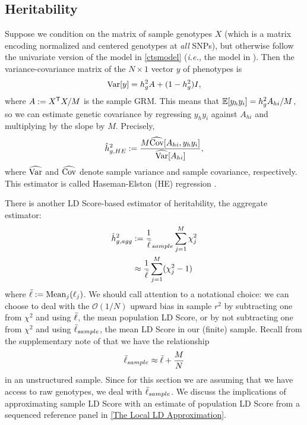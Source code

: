 \documentclass[11pt]{article}
\numberwithin{equation}{section}
\numberwithin{definition}{section}
\numberwithin{thm}{section}
\numberwithin{lemma}{section}
\numberwithin{prop}{section}
\numberwithin{cor}{section}
\numberwithin{hyp}{section}
\begin{document}
\subsection{Heritability}\label{HE:Heritability}

Suppose we condition on the matrix of sample genotypes $X$
(which is a matrix encoding normalized and centered genotypes at \emph{all} SNPs),
but otherwise follow the univariate version of the model in \ref{ctsmodel} (\emph{i.e.,} the model in \cite{buliksullivan2014}).
Then the variance-covariance matrix of the $N\times 1$ vector $y$ of phenotypes is
\begin{equation*}
	\mathrm{Var}[y]  =  h^2_gA + (1-h^2_g)I,
\end{equation*}
where $A := X^{\mathsf{T}}X/M$ is the sample GRM. 
This means that $\mathbb{E}[y_hy_i] = h^2_g A_{hi}/M$,
so we can estimate genetic covariance by regressing $y_hy_i$ against $A_{hi}$
and multiplying by the slope by $M$.
Precisely,
\begin{equation}
	\hat{h}^2_{g,HE} :=  \frac{M\widehat{\mathrm{Cov}}[A_{hi}, y_hy_i]}{\widehat{\mathrm{Var}}[A_{hi}]},
\end{equation}
where $\widehat{\mathrm{Var}}$ and $\widehat{\mathrm{Cov}}$ denote sample variance and sample covariance, respectively.
This estimator is called Haseman-Elston (HE) regression \cite{haseman1972}.

There is another LD Score-based estimator of heritability, 
the aggregate estimator:	
\begin{align}
	\hat{h}^2_{g, agg} 
&:= 
	\frac{1}{\bar{\ell}}_{sample}\sum_{j=1}^M \chi^2_j\\
&\approx
	\frac{1}{\bar{\ell}}\sum_{j=1}^M (\chi^2_j-1)
\end{align}
where $\bar{\ell} := \mathrm{Mean}_j(\ell_j)$. We should call attention to a notational choice: we can choose to deal with the $\mathscr{O}(1/N)$
upward bias in sample $r^2$ by subtracting one from $\chi^2$ and using $\bar{\ell}$, the mean population LD Score,
or by not subtracting one from $\chi^2$ and using $\bar{\ell}_{sample}$, the mean LD Score in our (finite) sample.
Recall from the supplementary note of \cite{buliksullivan2014} that we have the relationship
\begin{equation}
	\bar{\ell}_{sample} \approx \bar{\ell} + \dfrac{M}{N}
\end{equation}
in an unstructured sample.
Since for this section we are assuming that we have access to raw genotypes, we deal with $\bar{\ell}_{sample}$.
We discuss the implications of approximating sample LD Score with an estimate of population LD Score from a sequenced reference panel 
in \ref{The Local LD Approximation}.
\end{document}

